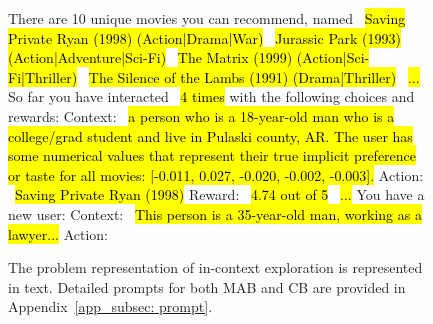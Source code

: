 \documentclass[11pt, logo]{googledeepmind}
\theoremstyle{plain}
\theoremstyle{definition}
\begin{document}
\begin{figure}[h]
\begin{minipage}[t]{0.63\textwidth}
\begin{tcolorbox} \newline
  There are 10 unique movies you can recommend, named \newline
     ~\hl{Saving Private Ryan (1998) (Action|Drama|War)} \newline
     ~\hl{Jurassic Park (1993) (Action|Adventure|Sci-Fi)} \newline
     ~\hl{The Matrix (1999) (Action|Sci-Fi|Thriller)} \newline
     ~\hl{The Silence of the Lambs (1991) (Drama|Thriller)} \newline
      ~\hl{...} \newline
    So far you have interacted ~\hl{4 times} with the following choices and rewards: \newline
    Context: ~\hl{a person who is a 18-year-old man who is a college/grad student and live in Pulaski county, AR. The user has some numerical values that represent their true implicit preference or taste for all movies: [-0.011, 0.027, -0.020, -0.002, -0.003].} \newline
    Action: ~\hl{Saving Private Ryan (1998)} \newline
    Reward: ~\hl{4.74 out of 5} \newline
    ~\hl{...} \newline
    You have a new user: \newline
    Context: ~\hl{This person is a 35-year-old man, working as a lawyer...}\newline
    Action:
    \end{tcolorbox}
\end{minipage}
    \caption{\footnotesize{The problem representation of in-context exploration is represented in text. Detailed prompts for both MAB and CB are provided in Appendix~\ref{app_subsec: prompt}.}}
    \label{fig:mab_cb_prompt}
\end{figure}
\end{document}
